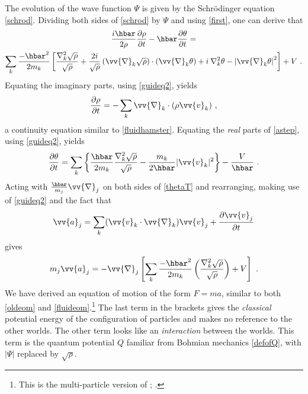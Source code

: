 \documentclass[12pt,secnumarabic,balancelastpage,amsmath,amssymb,nofootinbib]{article}
\begin{document}
The evolution of the wave function $\Psi$ is given by the Schr\"{o}dinger equation \eqref{schrod}.  Dividing both sides of \eqref{schrod} by $\Psi$ and using \eqref{first}, one can derive that
\begin{multline}
\frac{i\hbar}{2\rho}\frac{\partial\rho}{\partial t}-\hbar \frac{\partial \theta}{\partial t} = \\
\sum_k{\frac{-\hbar^2}{2 m_k}\left[\frac{\nabla_k^2 \sqrt{\rho}}{\sqrt{\rho}}+\frac{2 i}{\sqrt{\rho}} \left(\vv{\nabla}_k \sqrt{\rho}\right)\cdot\left(\vv{\nabla}_k \theta\right) + i \: \nabla_k^2 \theta - \left|\vv{\nabla}_k \theta\right|^2\right]}+V\ .
\label{astep}
\end{multline}
Equating the imaginary parts, using \eqref{guideq2}, yields
\begin{equation}
\frac{\partial\rho}{\partial t}=-\sum_k{\vv{\nabla}_k \cdot \left(\rho\vv{v}_k\right)}\ ,
\label{hamster}
\end{equation}
a continuity equation similar to \eqref{fluidhamster}.  Equating the \emph{real} parts of \eqref{astep}, using \eqref{guideq2}, yields
\begin{equation}
\frac{\partial \theta}{\partial t}=\sum_k{\left\{\frac{\hbar}{2 m_k}\frac{\nabla_k^2 \sqrt{\rho}}{\sqrt{\rho}}-\frac{m_k}{2 \hbar}|\vv{v}_k|^2\right\}}-\frac{V}{\hbar}\ .
\label{thetaT}
\end{equation}
Acting with $\frac{\hbar}{m_j}\vv{\nabla}_j$ on both sides of \eqref{thetaT} and rearranging, making use of \eqref{guideq2} and the fact that
\begin{equation}
\vv{a}_j=\sum_k (\vv{v}_k\cdot\vv{\nabla}_k)\vv{v}_j+\frac{\partial \vv{v}_j}{\partial t}
\label{accel}
\end{equation}
gives
\begin{equation}
m_j \vv{a}_j=-\vv{\nabla}_j\left[\sum_k \frac{-\hbar^2}{2 m_k }\left(\frac{\nabla_k^2 \sqrt{\rho}}{\sqrt{\rho}}\right)+V\right]\ .
\label{eom}
\end{equation}
We have derived an equation of motion of the form $F=ma$, similar to both \eqref{oldeom} and \eqref{fluideom}.\footnote{This is the multi-particle version of \citet[][eq. 1.7]{wyatt2005}; \citet[][eq. 4.9]{holland2005}.}  The last term in the brackets gives the \emph{classical} potential energy of the configuration of particles and makes no reference to the other worlds.  The other term looks like an \emph{interaction} between the worlds. This term is the quantum potential $Q$ familiar from Bohmian mechanics \eqref{defofQ}, with $|\Psi|$ replaced by $\sqrt{\rho}$.
\end{document}
